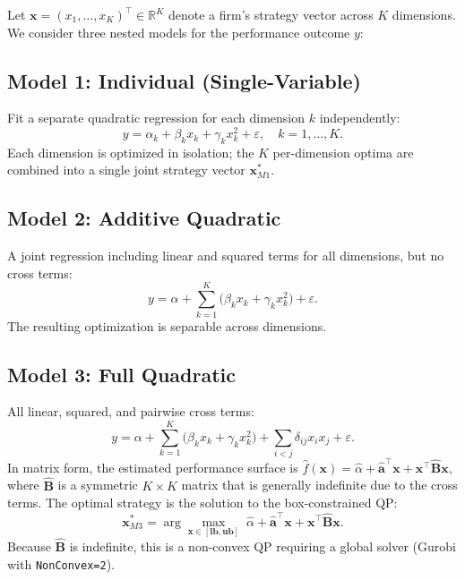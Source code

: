 \documentclass[12pt]{article}
\newcommand{\bx}{\mathbf{x}}
\newcommand{\bB}{\mathbf{B}}
\newcommand{\ba}{\mathbf{a}}
\begin{document}
Let $\bx = (x_1, \ldots, x_K)^\top \in \mathbb{R}^K$ denote a firm's strategy vector across $K$ dimensions. We consider three nested models for the performance outcome $y$:

\subsection{Model 1: Individual (Single-Variable)}

Fit a separate quadratic regression for each dimension $k$ independently:
\begin{equation}
    y = \alpha_k + \beta_k x_k + \gamma_k x_k^2 + \varepsilon, \quad k = 1, \ldots, K.
    \label{eq:m1}
\end{equation}
Each dimension is optimized in isolation; the $K$ per-dimension optima are combined into a single joint strategy vector $\bx^*_{M1}$.

\subsection{Model 2: Additive Quadratic}

A joint regression including linear and squared terms for all dimensions, but no cross terms:
\begin{equation}
    y = \alpha + \sum_{k=1}^{K} \bigl(\beta_k x_k + \gamma_k x_k^2\bigr) + \varepsilon.
    \label{eq:m2}
\end{equation}
The resulting optimization is separable across dimensions.

\subsection{Model 3: Full Quadratic}

All linear, squared, and pairwise cross terms:
\begin{equation}
    y = \alpha + \sum_{k=1}^{K} \bigl(\beta_k x_k + \gamma_k x_k^2\bigr) + \sum_{i < j} \delta_{ij} x_i x_j + \varepsilon.
    \label{eq:m3}
\end{equation}
In matrix form, the estimated performance surface is $\hat{f}(\bx) = \hat{\alpha} + \hat{\ba}^\top \bx + \bx^\top \hat{\bB} \bx$, where $\hat{\bB}$ is a symmetric $K \times K$ matrix that is generally indefinite due to the cross terms. The optimal strategy is the solution to the box-constrained QP:
\begin{equation}
    \bx^*_{M3} = \arg\max_{\bx \in [\mathbf{lb}, \mathbf{ub}]} \; \hat{\alpha} + \hat{\ba}^\top \bx + \bx^\top \hat{\bB} \bx.
    \label{eq:qp}
\end{equation}
Because $\hat{\bB}$ is indefinite, this is a non-convex QP requiring a global solver (Gurobi with \texttt{NonConvex=2}).
\end{document}
